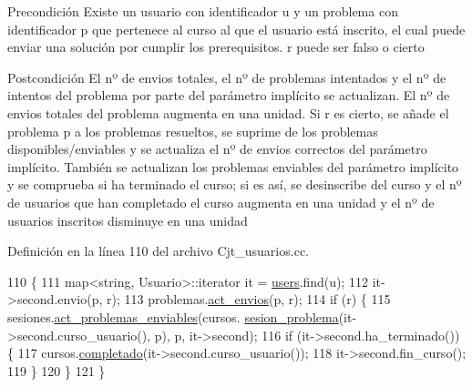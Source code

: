 \begin{DoxyPrecond}{Precondición}
Existe un usuario con identificador u y un problema con identificador p que pertenece al curso al que el usuario está inscrito, el cual puede enviar una solución por cumplir los prerequisitos. r puede ser falso o cierto 
\end{DoxyPrecond}
\begin{DoxyPostcond}{Postcondición}
El nº de envios totales, el nº de problemas intentados y el nº de intentos del problema por parte del parámetro implícito se actualizan. El nº de envios totales del problema augmenta en una unidad. Si r es cierto, se añade el problema p a los problemas resueltos, se suprime de los problemas disponibles/enviables y se actualiza el nº de envios correctos del parámetro implícito. También se actualizan los problemas enviables del parámetro implícito y se comprueba si ha terminado el curso; si es así, se desinscribe del curso y el nº de usuarios que han completado el curso augmenta en una unidad y el nº de usuarios inscritos disminuye en una unidad 
\end{DoxyPostcond}


Definición en la línea 110 del archivo Cjt\+\_\+usuarios.\+cc.


\begin{DoxyCode}
110                                                                                                            
                                        \{
111         map<string, Usuario>::iterator it = \mbox{\hyperlink{class_cjt__usuarios_a0b702ca0184d6fb2674cc827d39d5bff}{users}}.find(u);
112         it->second.envio(p, r);
113         problemas.\mbox{\hyperlink{class_cjt__problemas_abb0defe688a1012b27eddc463b53bf18}{act\_envios}}(p, r);
114         \textcolor{keywordflow}{if} (r) \{
115           sesiones.\mbox{\hyperlink{class_cjt__sesiones_a643292089a9534d7eea048df779e00fd}{act\_problemas\_enviables}}(cursos.
      \mbox{\hyperlink{class_cjt__cursos_acc9074c9338d31947bdd84e3498580be}{sesion\_problema}}(it->second.curso\_usuario(), p), p, it->second);
116           \textcolor{keywordflow}{if} (it->second.ha\_terminado()) \{
117             cursos.\mbox{\hyperlink{class_cjt__cursos_a140c61d43f549aa71503f5b8b080c48c}{completado}}(it->second.curso\_usuario());
118             it->second.fin\_curso();
119           \}
120         \}
121       \}
\end{DoxyCode}
\mbox{\label{class_cjt__usuarios_ab4351f7ee85af8de0f7387fc55d29755}} 
